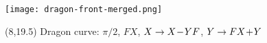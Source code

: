 \documentclass[final]{beamer}
\newcommand{\nt}{\negthinspace}
\newcommand{\m}{\nt-\nt}
\newcommand{\p}{\nt+\nt}
\begin{document}
\begin{frame}{}
\texttt{[image: dragon-front-merged.png]}
\begin{textblock}{20}(8,19.5)
Dragon curve: $\pi/2$, $FX$, $X\to X\m YF$, $Y\to FX\p Y$
\end{textblock}
\end{frame}
\end{document}
